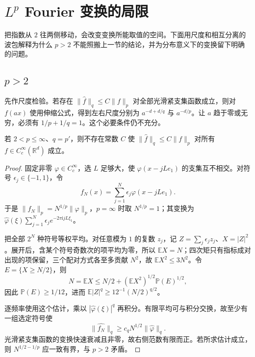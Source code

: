 \section{\texorpdfstring{\(L^p\)}{Lᵖ} Fourier 变换的局限}
\label{b2:sec:0403}

把指数从 \(2\) 往两侧移动，会改变变换所能取值的空间。下面用尺度和相互分离的波包解释为什么 \(p>2\) 不能照搬上一节的结论，并为分布意义下的变换留下明确的问题。

\subsection{\texorpdfstring{\(p>2\)}{p>2}}
\label{b2:subsec:040301}

先作尺度检验。若存在 \(\|\widehat f\|_q\leq C\|f\|_p\) 对全部光滑紧支集函数成立，则对 \(f(ax)\) 使用伸缩公式，得到左右尺度分别为 \(a^{-d+d/q}\) 与 \(a^{-d/p}\)。让 \(a\) 趋于零或无穷，必须有 \(1/p+1/q=1\)。这个必要条件仍不充分。

\begin{theorem}\label{b2:thm:04-p-above-two}
若 \(2<p\leq\infty\)、\(q=p'\)，则不存在常数 \(C\) 使 \(\|\widehat f\|_q\leq C\|f\|_p\) 对所有 \(f\in C_c^\infty(\mathbb R^d)\) 成立。
\end{theorem}
\begin{proof}
固定非零 \(\varphi\in C_c^\infty\)，选 \(L\) 足够大，使 \(\varphi(x-jLe_1)\) 的支集互不相交。对符号 \(\epsilon_j\in\{-1,1\}\)，令
\[
 f_N(x)=\sum_{j=1}^N\epsilon_j\varphi(x-jLe_1).
\]
于是 \(\|f_N\|_p=N^{1/p}\|\varphi\|_p\)，\(p=\infty\) 时取 \(N^{1/p}=1\)；其变换为 \(\widehat\varphi(\xi)\sum_{j=1}^N\epsilon_je^{-2\pi\mathrm{i}jL\xi_1}\)。

把全部 \(2^N\) 种符号等权平均。对任意模为 \(1\) 的复数 \(z_j\)，记 \(Z=\sum_j\epsilon_jz_j\)、\(X=|Z|^2\)。展开后，含某个符号奇数次的项平均为零，所以 \(\mathbb EX=N\)；四次矩只有指标成对出现的项保留，三个配对方式各至多贡献 \(N^2\)，故 \(\mathbb EX^2\leq3N^2\)。令 \(E=\{X\geq N/2\}\)，则
\[
 N=\mathbb EX\leq N/2+(\mathbb EX^2)^{1/2}\mathbb P(E)^{1/2},
\]
因此 \(\mathbb P(E)\geq1/12\)，进而 \(\mathbb E|Z|^q\geq12^{-1}(N/2)^{q/2}\)。

逐频率使用这个估计，乘以 \(|\widehat\varphi(\xi)|^q\) 再积分。有限平均可与积分交换，故至少有一组选定符号使
\[
 \|\widehat {f_N}\|_q\geq c_qN^{1/2}\|\widehat\varphi\|_q.
\]
光滑紧支集函数的变换快速衰减且非零，故右侧范数有限而正。若所求估计成立，则 \(N^{1/2-1/p}\) 应一致有界，与 \(p>2\) 矛盾。
\end{proof}

